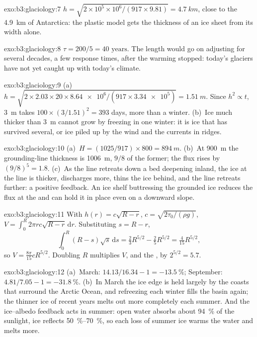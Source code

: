 \begin{solution}{exo:b3:glaciology:7}
$h = \sqrt{2\times10^5\times10^6/(917\times9.81)} = \qty{4.7}{km}$, close to
the \qty{4.9}{km} of Antarctica: the plastic model gets the thickness of an
ice sheet from its width alone.
\end{solution}

\begin{solution}{exo:b3:glaciology:8}
$\tau = 200/5 = \num{40}\text{ years}$. The length would go on adjusting for
several decades, a few response times, after the warming stopped: today's
glaciers have not yet caught up with today's climate.
\end{solution}

\begin{solution}{exo:b3:glaciology:9}
(a)~$h = \sqrt{2\times2.03\times20\times\num{8.64e6}/(917\times\num{3.34e5})}
= \qty{1.51}{m}$. Since $h^2 \propto t$, \qty{3}{m} takes $100\times
(3/1.51)^2 = 393$ days, more than a winter. (b)~Ice much thicker than
\qty{3}{m} cannot grow by freezing in one winter: it is ice that has
survived several, or ice piled up by the wind and the currents in ridges.
\end{solution}

\begin{solution}{exo:b3:glaciology:10}
(a)~$H = (1025/917)\times800 = \qty{894}{m}$. (b)~At \qty{900}{m} the
grounding-line thickness is \qty{1006}{m}, $9/8$ of the former; the flux
rises by $(9/8)^5 = 1.8$. (c)~As the line retreats down a bed deepening
inland, the ice at the line is thicker, discharges more, thins the ice
behind, and the line retreats further: a positive feedback. An ice shelf
buttressing the grounded ice reduces the flux at the  and can
hold it in place even on a downward slope.
\end{solution}

\begin{solution}{exo:b3:glaciology:11}
With $h(r) = c\sqrt{R - r}$, $c = \sqrt{2\tau_0/(\rho g)}$, $V =
\int_0^R2\pi rc\sqrt{R - r}\,\mathrm dr$. Substituting $s = R - r$,
\[
\int_0^R(R - s)\sqrt s\,\mathrm ds = \tfrac23R^{5/2} - \tfrac25R^{5/2} =
\tfrac4{15}R^{5/2},
\]
so $V = \frac{8\pi}{15}cR^{5/2}$. Doubling $R$
multiplies $V$, and the , by $2^{5/2} = 5.7$.
\end{solution}

\begin{solution}{exo:b3:glaciology:12}
(a)~March: $14.13/16.34 - 1 = \qty{-13.5}{\percent}$; September: $4.81/7.05
- 1 = \qty{-31.8}{\percent}$. (b)~In March the ice edge is held largely by
the coasts that surround the Arctic Ocean, and refreezing each winter
fills the basin again; the thinner ice of recent years melts out more
completely each summer. And the ice--albedo feedback acts in summer: open
water absorbs about \qty{94}{\percent} of the sunlight, ice reflects
\qtyrange{50}{70}{\percent}, so each loss of summer ice warms the water and
melts more.
\end{solution}

